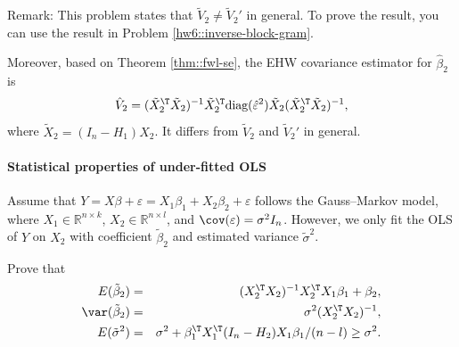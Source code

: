 Remark: 
This problem states that $\tilde V_2  \neq \tilde V_2 ' $ in general. To prove the result, you can use the result in Problem \ref{hw6::inverse-block-gram}. 

Moreover, based on Theorem \ref{thm::fwl-se}, the EHW covariance estimator for $\hat{\beta}_2$ is
$$
\hat{V}_2 = (\tilde X_2^{\T} \tilde X_2)^{-1}   \tilde X_2^{\T}  \text{diag}(\hat \varepsilon^2)  \tilde X_2 (\tilde X_2^{\T} \tilde X_2)^{-1},
$$
where $ \tilde X_2 = (I_n - H_1) X_2$. It differs from $\tilde V_2 $ and $ \tilde V_2 ' $ in general.

 
 
 \paragraph{Statistical properties of under-fitted OLS}
\label{hw::underfit-ols}


Assume that $Y = X \beta + \varepsilon = X_1 \beta_1 + X_2 \beta_2 + \varepsilon$ follows the Gauss--Markov model, where $X_1 \in \mathbb{R}^{n\times k}$, $X_2 \in \mathbb{R}^{n\times l}$, and $\cov(\varepsilon)=\sigma^2 I_n$. However, we only fit the OLS of $Y$ on $X_2$ with coefficient $\tilde{\beta}_2$ and estimated variance $\tilde{\sigma}^2$. 

Prove that
\begin{eqnarray*}
E(\tilde{\beta}_2) &=&  (X_2^{\T} X_2)^{-1} X_2^{\T} X_1 \beta_1 +   \beta_2 ,\\ 
\var( \tilde{\beta}_2) &=& \sigma^2 (X_2^{\T} X_2)^{-1} , \\
E(\tilde{\sigma}^2) &=& \sigma^2 + \beta_1^{\T} X_1^{\T} (I_n - H_2) X_1\beta_1/(n-l) \geq \sigma^2 . 
\end{eqnarray*}
 
 


